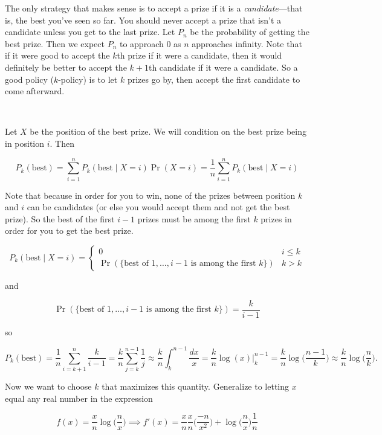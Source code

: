 \begin{solution}
The only strategy that makes sense is to accept a prize if it is a \textit{candidate}---that is, the best you've seen so far. You should never accept a prize that isn't a candidate unless you get to the last prize. Let \(P_n\) be the probability of getting the best prize. Then we expect \(P_n\) to approach 0 as \(n\) approaches infinity. Note that if it were good to accept the \(k\)th prize if it were a candidate, then it would definitely be better to accept the \(k+1\)th candidate if it were a candidate. So a good policy (\(k\)-policy) is to let \(k\) prizes go by, then accept the first candidate to come afterward. 

\

Let \(X\) be the position of the best prize. We will condition on the best prize being in position \(i\). Then

\[
P_k(\text{best}) = \sum_{i=1}^n P_k(\text{best} \mid X=i)  \Pr(X=i) = \frac{1}{n} \sum_{i=1}^n P_k(\text{best} \mid X=i)
\]

Note that because in order for you to win, none of the prizes between position \(k\) and \(i\) can be candidates (or else you would accept them and not get the best prize). So the best of the first \(i-1\) prizes must be among the first \(k\) prizes in order for you to get the best prize. 

\[
P_k(\text{best} \mid X=i) = \begin{cases} 
0 & i \leq k \\
\Pr(\{\text{best of }1, \ldots, i-1 \text{ is among the first } k\}) & k > k
\end{cases}
\]

and 

\[
\Pr(\{\text{best of }1, \ldots, i-1 \text{ is among the first } k\}) = \frac{k}{i-1}
\]

so

\[
P_k(\text{best}) = \frac{1}{n} \sum_{i=k+1}^n \frac{k}{i-1} = \frac{k}{n} \sum_{j=k}^{n-1} \frac{1}{j} \approx \frac{k}{n} \int_{k}^{n-1} \frac{dx}{x} = \frac{k}{n} \log(x) \big|_{k}^{n-1} = \frac{k}{n} \log\bigg( \frac{n-1}{k} \bigg) \approx  \boxed{\frac{k}{n} \log \bigg( \frac{n}{k} \bigg)}.
\]

Now we want to choose \(k\) that maximizes this quantity. Generalize to letting \(x\) equal any real number in the expression 

\[
f(x) = \frac{x}{n} \log \bigg( \frac{n}{x} \bigg) \implies f'(x) = \frac{x}{n} \frac{x}{n} \bigg( \frac{-n}{x^2} \bigg) + \log \bigg( \frac{n}{x} \bigg) \frac{1}{n} 
\]


\end{solution}
